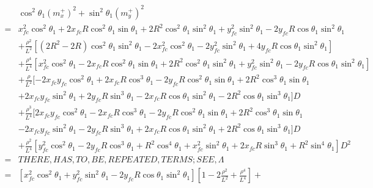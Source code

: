 \documentclass[12pt]{article}
\begin{document}
\begin{align}
    &\cos^2\theta_1(m_x^+)^2 + \sin^2\theta_1(m_y^+)^2\\
    =& x_{fc}^2\cos^2\theta_1 +2x_{fc}R\cos^2\theta_1\sin\theta_1 + 2R^2\cos^2\theta_1\sin^2\theta_1 + y_{fc}^2\sin^2\theta_1 -2y_{fc}R\cos\theta_1\sin^2\theta_1 \nonumber\\
    &+ \frac{\rho^2}{L^2}[(2R^2-2R)\cos^2\theta_1\sin^2\theta_1 -2x_{fc}^2\cos^2\theta_1 -2y_{fc}^2\sin^2\theta_1 + 4y_{fc}R\cos\theta_1\sin^2\theta_1] \nonumber\\
    &+ \frac{\rho^4}{L^4}[x_{fc}^2\cos^2\theta_1 - 2x_{fc}R\cos^2\theta_1\sin\theta_1 + 2R^2\cos^2\theta_1\sin^2\theta_1 + y_{fc}^2\sin^2\theta_1 -2y_{fc}R\cos\theta_1\sin^2\theta_1] \nonumber\\
    &+ \frac{\rho}{L^2}[-2x_{fc}y_{fc}\cos^2\theta_1 +2x_{fc}R\cos^3\theta_1 -2y_{fc}R\cos^2\theta_1\sin\theta_1 +2R^2\cos^3\theta_1\sin\theta_1  \nonumber\\
    &+ 2x_{fc}y_{fc}\sin^2\theta_1 + 2y_{fc}R\sin^3\theta_1  -2x_{fc}R\cos\theta_1\sin^2\theta_1 -2R^2\cos\theta_1\sin^3\theta_1]D \nonumber\\
    &+ \frac{\rho^3}{L^4}[2x_{fc}y_{fc}\cos^2\theta_1 -2x_{fc}R\cos^3\theta_1  -2y_{fc}R\cos^2\theta_1\sin\theta_1 +2R^2\cos^3\theta_1\sin\theta_1  \nonumber\\
    &- 2x_{fc}y_{fc}\sin^2\theta_1 - 2y_{fc}R\sin^3\theta_1 + 2x_{fc}R\cos\theta_1\sin^2\theta_1 + 2R^2\cos\theta_1\sin^3\theta_1]D \nonumber\\
    &+ \frac{\rho^2}{L^4}[y_{fc}^2\cos^2\theta_1 -2y_{fc}R\cos^3\theta_1 +R^2\cos^4\theta_1 + x_{fc}^2\sin^2\theta_1 + 2x_{fc}R\sin^3\theta_1 + R^2\sin^4\theta_1]D^2\\
    =& THERE,HAS,TO,BE,REPEATED,TERMS;SEE,\Lambda\\
    =& [x_{fc}^2\cos^2\theta_1 + y_{fc}^2\sin^2\theta_1  -2y_{fc}R\cos\theta_1\sin^2\theta_1][1 -2\frac{\rho^2}{L^2} + \frac{\rho^4}{L^4}] + 
\end{align}
\end{document}
